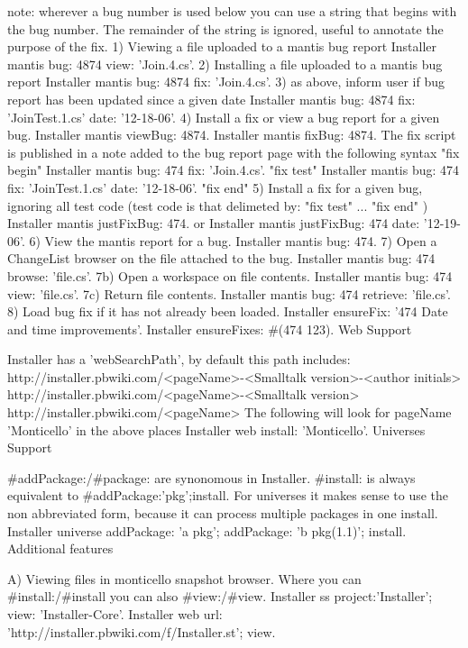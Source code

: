 \documentclass[a4paper,10pt,twoside]{book}
\begin{document}
note: wherever a bug number is used below you can use a string that begins with the bug number. The remainder of the string is ignored, useful to annotate the purpose of the fix.
1) Viewing a file uploaded to a mantis bug report
Installer mantis bug: 4874 view: 'Join.4.cs'.
2) Installing a file uploaded to a mantis bug report
Installer mantis bug: 4874 fix: 'Join.4.cs'.
3) as above, inform user if bug report has been updated since a given date 
Installer mantis bug: 4874 fix: 'JoinTest.1.cs' date: '12-18-06'. 
4) Install a fix or view a bug report for a given bug.
Installer mantis viewBug: 4874.
Installer mantis fixBug: 4874.
The fix script is published in a note added to the bug report page with the following syntax
"fix begin"
Installer mantis bug: 474 fix: 'Join.4.cs'.
"fix test"
Installer mantis bug: 474 fix: 'JoinTest.1.cs' date: '12-18-06'. 
"fix end"
5) Install a fix for a given bug, ignoring all test code
(test code is that delimeted by: "fix test" ... "fix end" )
Installer mantis justFixBug: 474.
or
Installer mantis justFixBug: 474 date: '12-19-06'.
6) View the mantis report for a bug.
Installer mantis bug: 474.
7) Open a ChangeList browser on the file attached to the bug.
Installer mantis bug: 474 browse: 'file.cs'.
7b) Open a workspace on file contents.
Installer mantis bug: 474 view: 'file.cs'.
7c) Return file contents.
Installer mantis bug: 474 retrieve: 'file.cs'.
8) Load bug fix if it has not already been loaded.
Installer ensureFix: '474 Date and time improvements'.
Installer ensureFixes: #(474 123).
Web Support

Installer has a 'webSearchPath', by default this path includes:
http://installer.pbwiki.com/<pageName>-<Smalltalk version>-<author initials>
http://installer.pbwiki.com/<pageName>-<Smalltalk version>
http://installer.pbwiki.com/<pageName>
The following will look for pageName 'Monticello' in the above places
Installer web install: 'Monticello'.
Universes Support

#addPackage:/#package: are synonomous in Installer. #install: is always equivalent to #addPackage:'pkg';install. For universes it makes sense to use the non abbreviated form, because it can process multiple packages in one install.
Installer universe 
addPackage: 'a pkg';
addPackage: 'b pkg(1.1)';
install.
Additional features

A) Viewing files in monticello snapshot browser.
Where you can #install:/#install you can also #view:/#view.
Installer ss project:'Installer'; view: 'Installer-Core'.
Installer web url: 'http://installer.pbwiki.com/f/Installer.st'; view.
\end{document}
